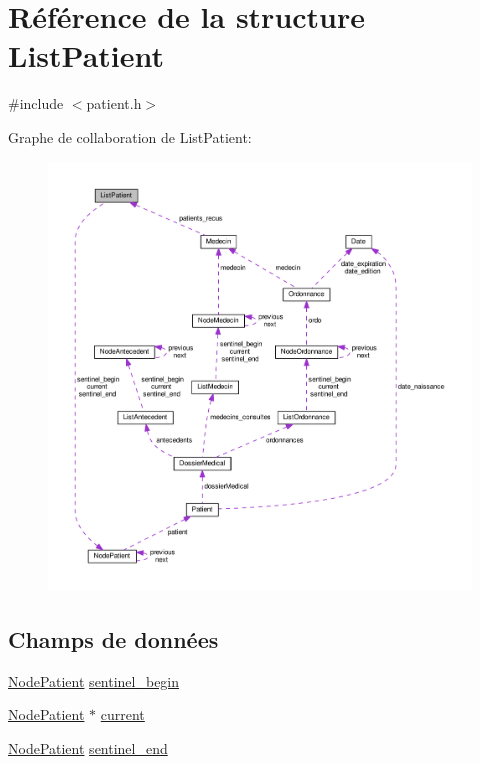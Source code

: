 \hypertarget{struct_list_patient}{\section{Référence de la structure List\-Patient}
\label{struct_list_patient}
}


{\ttfamily \#include $<$patient.\-h$>$}



Graphe de collaboration de List\-Patient\-:
\nopagebreak
\begin{figure}[H]
\begin{center}
\leavevmode
\includegraphics[width=350pt]{struct_list_patient__coll__graph}
\end{center}
\end{figure}
\subsection*{Champs de données}
\begin{DoxyCompactItemize}
\item 
\hyperlink{struct_node_patient}{Node\-Patient} \hyperlink{struct_list_patient_acacbc6137b28bb2b48b0a2cfe4305024}{sentinel\-\_\-begin}
\item 
\hyperlink{struct_node_patient}{Node\-Patient} $\ast$ \hyperlink{struct_list_patient_ae1c66e6952e3fd81efd6fe0f72a51826}{current}
\item 
\hyperlink{struct_node_patient}{Node\-Patient} \hyperlink{struct_list_patient_ad2cb1194a61ed31c401c99218ff6dbb7}{sentinel\-\_\-end}
\end{DoxyCompactItemize}


